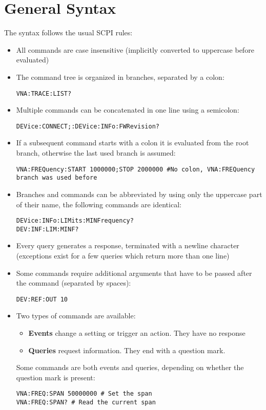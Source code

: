 \documentclass[a4paper,11pt]{article}
\begin{document}
\section{General Syntax}
The syntax follows the usual SCPI rules:
\begin{itemize}
\item All commands are case insensitive (implicitly converted to uppercase before evaluated)
\item The command tree is organized in branches, separated by a colon:
\begin{lstlisting}
VNA:TRACE:LIST?
\end{lstlisting}
\item Multiple commands can be concatenated in one line using a semicolon:
\begin{lstlisting}
DEVice:CONNECT;:DEVice:INFo:FWRevision?
\end{lstlisting}
\item If a subsequent command starts with a colon it is evaluated from the root branch, otherwise the last used branch is assumed:
\begin{lstlisting}
VNA:FREQuency:START 1000000;STOP 2000000 #No colon, VNA:FREQuency branch was used before
\end{lstlisting}
\item Branches and commands can be abbreviated by using only the uppercase part of their name, the following commands are identical:
\begin{lstlisting}
DEVice:INFo:LIMits:MINFrequency?
DEV:INF:LIM:MINF?
\end{lstlisting}
\item Every query generates a response, terminated with a newline character (exceptions exist for a few queries which return more than one line)
\item Some commands require additional arguments that have to be passed after the command (separated by spaces):
\begin{lstlisting}
DEV:REF:OUT 10
\end{lstlisting}
\item Two types of commands are available:
\begin{itemize}
\item \textbf{Events} change a setting or trigger an action. They have no response
\item \textbf{Queries} request information. They end with a question mark.
\end{itemize}
Some commands are both events and queries, depending on whether the question mark is present:
\begin{lstlisting}
VNA:FREQ:SPAN 50000000 # Set the span
VNA:FREQ:SPAN? # Read the current span
\end{lstlisting}
\end{itemize}
\end{document}
